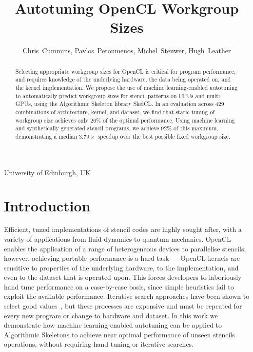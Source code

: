 \documentclass[hidelinks]{acaces}
\begin{document}
  \title{Autotuning OpenCL Workgroup Sizes}

  \author{
  Chris~Cummins,
  Pavlos~Petoumenos,
  Michel~Steuwer,
  Hugh~Leather
  }

  \address{1}{
  University of Edinburgh,
  UK
  }


  \pagestyle{empty}


  \begin{abstract}
    Selecting appropriate workgroup sizes for OpenCL is critical for
    program performance, and requires knowledge of the underlying
    hardware, the data being operated on, and the kernel
    implementation. We propose the use of machine learning-enabled
    autotuning to automatically predict workgroup sizes for stencil
    patterns on CPUs and multi-GPUs, using the Algorithmic Skeleton
    library SkelCL. In an evaluation across 429 combinations of
    architecture, kernel, and dataset, we find that static tuning of
    workgroup size achieves only $26\%$ of the optimal
    performance. Using machine learning and synthetically generated
    stencil programs, we achieve $92\%$ of this maximum, demonstrating a
    median $3.79\times$ speedup over the best possible fixed workgroup
    size.
  \end{abstract}

  \vspace{-.5em}

  \vspace{-2em}
  \section{Introduction}

  Efficient, tuned implementations of stencil codes are highly sought
  after, with a variety of applications from fluid dynamics to quantum
  mechanics. OpenCL enables the application of a range of heterogeneous
  devices to parallelise stencils; however, achieving portable
  performance is a hard task --- OpenCL kernels are sensitive to
  properties of the underlying hardware, to the implementation, and even
  to the dataset that is operated upon. This forces developers to
  laboriously hand tune performance on a case-by-case basis, since
  simple heuristics fail to exploit the available performance. Iterative
  search approaches have been shown to select good
  values~\cite{Nugteren2015,Ansel2013,Zhang2013a}, but these processes
  are expensive and must be repeated for every new program or change to
  hardware and dataset. In this work we demonstrate how machine
  learning-enabled autotuning can be applied to Algorithmic Skeletons to
  achieve near optimal performance of unseen stencils operations,
  without requiring hand tuning or iterative searches.
\end{document}
